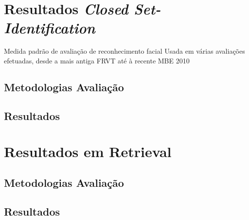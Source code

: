 \section{Resultados \textit{Closed Set-Identification}} \label{sec:avaliacao1}
Medida padrão de avaliação de reconhecimento facial
Usada em várias avaliações efetuadas, desde a mais antiga FRVT até à recente MBE 2010

\subsection{Metodologias Avaliação}

\subsection{Resultados}

\section{Resultados em Retrieval} \label{sec:avaliacao2}

\subsection{Metodologias Avaliação}

\subsection{Resultados}

